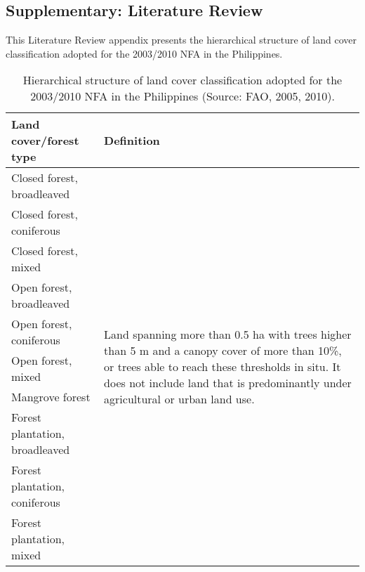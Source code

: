 
\appendix

\begin{appendices}

\chapter{Supplementary: Literature Review}
\label{sup: supplementary-litrev}

This Literature Review appendix presents the hierarchical structure of land cover classification adopted for the 2003/2010 NFA in the Philippines.
	\vspace*{10cm}


\begin{spacing}{1.0}
\begin{longtable}[h!]{ p{6cm} p{8cm} }

    \caption[LCCS hierarchical structure adopted for the 2003/2010 NFA in the Philippines.]{Hierarchical structure of land cover classification adopted for the 2003/2010 NFA in the Philippines (Source: FAO, 2005, 2010).}
    \label{tab: appendix-table.a1}\\
    
    \toprule
    Land cover/forest type & Definition \\
    \midrule
    \endhead

    Closed forest, broadleaved & \multirow{10}{8cm}[1cm]{Land spanning more than 0.5 ha with trees higher than 5 m and a canopy cover of more than 10\%, or trees able to reach these thresholds in situ. It does not include land that is predominantly under agricultural or urban land use.}\\
    Closed forest, coniferous & {}\\
    Closed forest, mixed & {}\\
    Open forest, broadleaved & {}\\
    Open forest, coniferous & {}\\
    Open forest, mixed & {}\\
    Mangrove forest & {}\\
    Forest plantation, broadleaved & {}\\
    Forest plantation, coniferous & {}\\
    Forest plantation, mixed & {}\\[3pt]
    

\end{longtable}
\end{spacing}
\end{appendices}
